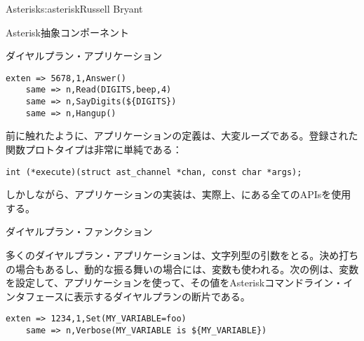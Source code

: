 \begin{aosachapter}{Asterisk}{s:asterisk}{Russell Bryant}
\begin{aosasect1}{Asterisk抽象コンポーネント}
\begin{aosasect2}{ダイヤルプラン・アプリケーション}
\begin{verbatim}
exten => 5678,1,Answer()
    same => n,Read(DIGITS,beep,4)
    same => n,SayDigits(${DIGITS})
    same => n,Hangup()
\end{verbatim}

前に触れたように、アプリケーションの定義は、大変ルーズである。登録された関数プロトタイプは非常に単純である：

\begin{verbatim}
int (*execute)(struct ast_channel *chan, const char *args);
\end{verbatim}

\noindent
しかしながら、アプリケーションの実装は、実際上、にある全てのAPIsを使用する。

\end{aosasect2}

\begin{aosasect2}{ダイヤルプラン・ファンクション}

多くのダイヤルプラン・アプリケーションは、文字列型の引数をとる。決め打ちの場合もあるし、動的な振る舞いの場合には、変数も使われる。次の例は、変数を設定して、アプリケーションを使って、その値をAsteriskコマンドライン・インタフェースに表示するダイヤルプランの断片である。

\begin{verbatim}
exten => 1234,1,Set(MY_VARIABLE=foo)
    same => n,Verbose(MY_VARIABLE is ${MY_VARIABLE})
\end{verbatim}


\end{aosasect2}
\end{aosasect1}
\end{aosachapter}
